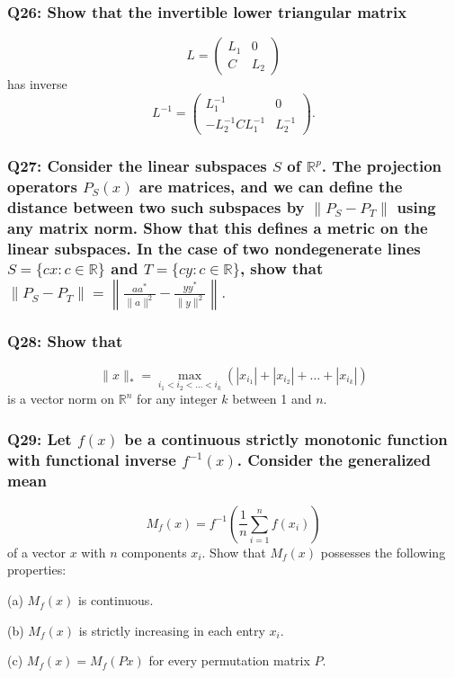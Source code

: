 \documentclass[8pt]{article}
\begin{document}
\subsubsection*{Q26: Show that the invertible lower triangular matrix}
\[
L = \begin{pmatrix}
L_1 & 0 \\
C & L_2
\end{pmatrix}
\]
has inverse
\[
L^{-1} = \begin{pmatrix}
L_1^{-1} & 0 \\
-L_2^{-1} C L_1^{-1} & L_2^{-1}
\end{pmatrix}.
\]

\subsubsection*{Q27: Consider the linear subspaces \( S \) of \( \mathbb{R}^p \). The projection operators \( P_S(x) \) are matrices, and we can define the distance between two such subspaces by \( \| P_S - P_T \| \) using any matrix norm. Show that this defines a metric on the linear subspaces. In the case of two nondegenerate lines \( S = \{ cx : c \in \mathbb{R} \} \) and \( T = \{ cy : c \in \mathbb{R} \} \), show that \( \| P_S - P_T \| = \left\| \frac{aa^*}{\| a \|^2} - \frac{yy^*}{\| y \|^2} \right\|. \)}

\subsubsection*{Q28: Show that}
\[
\| x \|_* = \max_{i_1 < i_2 < \ldots < i_k} ( |x_{i_1}| + |x_{i_2}| + \ldots + |x_{i_k}| )
\]
is a vector norm on \( \mathbb{R}^n \) for any integer \( k \) between 1 and \( n \).

\subsubsection*{Q29: Let \( f(x) \) be a continuous strictly monotonic function with functional inverse \( f^{-1}(x) \). Consider the generalized mean}
\[
M_f(x) = f^{-1} \left( \frac{1}{n} \sum_{i=1}^n f(x_i) \right)
\]
of a vector \( x \) with \( n \) components \( x_i \). Show that \( M_f(x) \) possesses the following properties:

(a) \( M_f(x) \) is continuous.

(b) \( M_f(x) \) is strictly increasing in each entry \( x_i \).

(c) \( M_f(x) = M_f(Px) \) for every permutation matrix \( P \).
\end{document}
